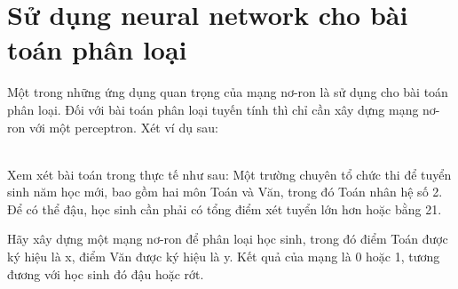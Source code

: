\section{Sử dụng neural network cho bài toán phân loại}
\label{sec:classification}
Một trong những ứng dụng quan trọng của mạng nơ-ron là sử dụng cho bài toán phân loại. Đối với bài toán phân loại tuyến tính thì chỉ cần xây dựng mạng nơ-ron với một perceptron. Xét ví dụ sau:

\begin{exmp}
\label{example3}
\hrulefill\\
Xem xét bài toán trong thực tế như sau: Một trường chuyên tổ chức thi để tuyển sinh năm học mới, bao gồm hai môn Toán và Văn, trong đó Toán nhân hệ số 2. Để có thể đậu, học sinh cần phải có tổng điểm xét tuyển lớn hơn hoặc bằng 21. 

Hãy xây dựng một mạng nơ-ron để phân loại học sinh, trong đó điểm Toán được ký hiệu là x, điểm Văn được ký hiệu là y. Kết quả của mạng là 0 hoặc 1, tương đương với học sinh đó đậu hoặc rớt.
\end{exmp}
